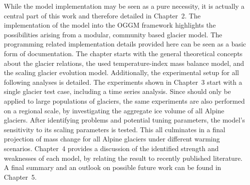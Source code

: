     While the model implementation may be seen as a pure necessity, it is actually a central part of this work and therefore detailed in Chapter~2. The implementation of the \vas{} model into the OGGM framework highlights the possibilities arising from a modular, community based glacier model. The programming related implementation details provided here can be seen as a basic form of documentation. The chapter starts with the general theoretical concepts about the glacier \vas{} relations, the used temperature-index mass balance model, and the scaling glacier evolution model. Additionally, the experimental setup for all following analyses is detailed.
    The experiments shown in Chapter~3 start with a single glacier test case, including a time series analysis. Since \vas{} should only be applied to large populations of glaciers, the same experiments are also performed on a regional scale, by investigating the aggregate ice volume of all Alpine glaciers. After identifying problems and potential tuning parameters, the model's sensitivity to its scaling parameters is tested. This all culminates in a final projection of mass change for all Alpine glaciers under different warming scenarios.
    Chapter~4 provides a discussion of the identified strength and weaknesses of each model, by relating the result to recently published literature. A final summary and an outlook on possible future work can be found in Chapter~5.

